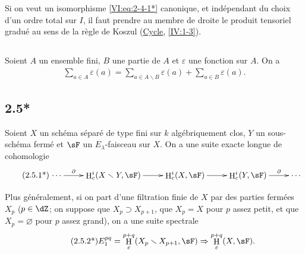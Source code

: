 \documentclass[oneside]{book}
\DeclareMathOperator{\h}{H}
\renewcommand{\setminus}{\smallsetminus}
\theoremstyle{sga-source}
\theoremstyle{sga-source-dash}
\theoremstyle{sga-source-dotdash}
\theoremstyle{sga-source-number-note-dash}
\theoremstyle{sga-source-note-number-dotdash}
\theoremstyle{sga-source-example-dotdash}
\theoremstyle{sga-source-inline-number}
\theoremstyle{sga-source-bare-number}
\theoremstyle{sga-source}
\newcommand{\PrintPage}[1]{}\newcommand{\MathPage}[1]{}\newcommand{\PrintCite}[2]{#1}\newcommand{\var}[3]{#2}
\begin{document}
Si on veut un isomorphisme \eqref{VI:eq:2-4-1*} canonique, et indépendant du 
choix d'un ordre total sur $I$, il faut prendre au membre de droite le produit 
tensoriel gradué au sens de la règle de Koszul 
(\hyperref[IV]{Cycle}, \ref{IV:1-3}). 





\subsection{}\label{VI:2-5}

Soient $A$ un ensemble fini, $B$ une partie de $A$ et $\varepsilon$ une 
fonction sur $A$. On a 
\begin{align*}\tag{2.5.1}\label{VI:2-5-1}
  \sum_{a\in A} \varepsilon(a) = \sum_{a\in A\setminus B}\varepsilon(a) + \sum_{a\in B} \varepsilon(a) \text{.}
\end{align*}





\subsection*{2.5*}\label{VI:2-5*}

Soient $X$ un schéma séparé de type fini sur $k$ algébriquement clos, 
$Y$ un sous-schéma fermé et $\sF$ un $E_\lambda$-faisceau sur $X$. On a 
une suite exacte longue de cohomologie 
\begin{align*}\tag{2.5.1*}\label{VI:eq:2-5-1*}
\xymatrix{
  \cdots \ar[r]^-\partial 
    & \h_c^i(X\setminus Y,\sF) \ar[r] 
    & \h_c^i(X,\sF) \ar[r] 
    & \h_c^i(Y,\sF) \ar[r]^-\partial 
    & \cdots 
}
\end{align*}

\PrintPage{186}
Plus généralement, si on part d'une filtration finie de $X$ par des parties 
fermées $X_p$ ($p\in \dZ$; on suppose que $X_p\supset X_{p+1}$, que $X_p=X$ 
pour $p$ assez petit, et que $X_p=\varnothing$ pour $p$ assez grand), on a une 
suite spectrale 
\begin{align*}\tag{2.5.2*}\label{VI:eq:2-5-2*}
  E_1^{p q} = \h_c^{p+q}(X_p\setminus X_{p+1},\sF) \Rightarrow \h_c^{p+q}(X,\sF) \text{.}
\end{align*}





\subsection{}\label{VI:2-6}
\end{document}
